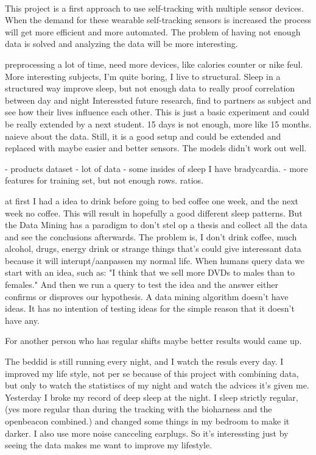 	\\
	 This project is a first approach to use self-tracking with multiple sensor devices. When the demand for these wearable self-tracking sensors is increased the process will get more efficient and more automated. The problem of having not enough data is solved and analyzing the data will be more interesting. 

	\iffalse
	preprocessing a lot of time, 
	need more devices, like calories counter or nike feul.
	More interesting subjects, I'm quite boring, I live to structural.
	Sleep in a structured way improve sleep, 
		but not enough data to really proof correlation between day and night
	Interessted future research, find to partners as subject and see how their lives influence each other.
	This is just a basic experiment and could be really extended by a next student.
	15 days is not enough, more like 15 months. 
	naieve about the data. 
	Still, it is a good setup and could be extended and replaced with maybe easier and better sensors. 
 The models didn't work out well.


	- products dataset
	- lot of data
	-  some insides of sleep
	I have bradycardia. 
	- more features for training set, but not enough rows. ratios.

	at first I had a idea to drink before going to bed coffee one week, and the next week no coffee. This will result in hopefully a good different sleep patterns. But the Data Mining has a paradigm to don't stel op a thesis and collect all the data and see the conclusions afterwards. The problem is, I don't drink coffee, much alcohol, drugs, energy drink or strange things that's could give interessant data because it will interupt/aanpassen my normal life. 
When humans query data we start with an idea, such as: "I think that we sell more DVDs to males than to females." And then we run a query to test the idea and the answer either confirms or disproves our hypothesis. A data mining algorithm doesn't have ideas. It has no intention of testing ideas for the simple reason that it doesn't have any.

	For another person who has regular shifts maybe better results would came up.


	The beddid is still running every night, and I watch the resuls every day. I improved my life style, not per se because of this project with combining data, but only to watch the statistiscs of my night and watch the advices it's given me. Yesterday I broke my record of deep sleep at the night. I sleep strictly regular, (yes more regular than during the tracking with the bioharness and the openbeacon combined.) and changed some things in my bedroom to make it darker. I also use more noise cancceling earplugs. So it's interessting just by seeing the data makes me want to improve my lifestyle. 

